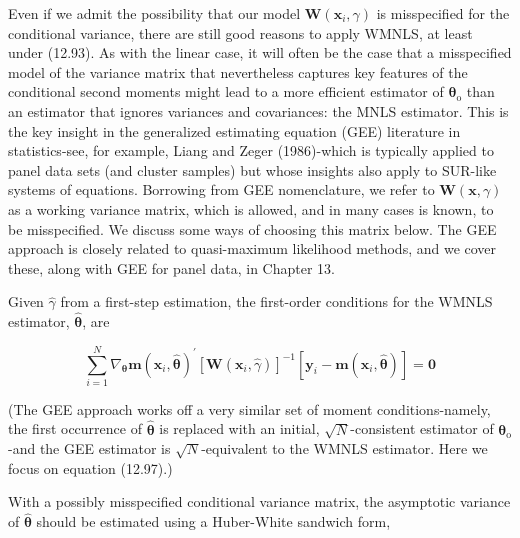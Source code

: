 \documentclass[10pt]{article}
\begin{document}
Even if we admit the possibility that our model $\mathbf{W}\left(\mathbf{x}_{i}, \gamma\right)$ is misspecified for the conditional variance, there are still good reasons to apply WMNLS, at least under (12.93). As with the linear case, it will often be the case that a misspecified model of the variance matrix that nevertheless captures key features of the conditional second moments might lead to a more efficient estimator of $\boldsymbol{\theta}_{\mathrm{o}}$ than an estimator that ignores variances and covariances: the MNLS estimator. This is the key insight in the generalized estimating equation (GEE) literature in statistics-see, for example, Liang and Zeger (1986)-which is typically applied to panel data sets (and cluster samples) but whose insights also apply to SUR-like systems of equations. Borrowing from GEE nomenclature, we refer to $\mathbf{W}(\mathbf{x}, \gamma)$ as a working variance matrix, which is allowed, and in many cases is known, to be misspecified. We discuss some ways of choosing this matrix below. The GEE approach is closely related to quasi-maximum likelihood methods, and we cover these, along with GEE for panel data, in Chapter 13.

Given $\hat{\gamma}$ from a first-step estimation, the first-order conditions for the WMNLS estimator, $\hat{\boldsymbol{\theta}}$, are


\begin{equation*}
\sum_{i=1}^{N} \nabla_{\boldsymbol{\theta}} \mathbf{m}\left(\mathbf{x}_{i}, \hat{\boldsymbol{\theta}}\right)^{\prime}\left[\mathbf{W}\left(\mathbf{x}_{i}, \hat{\gamma}\right)\right]^{-1}\left[\mathbf{y}_{i}-\mathbf{m}\left(\mathbf{x}_{i}, \hat{\boldsymbol{\theta}}\right)\right]=\mathbf{0} \tag{12.97}
\end{equation*}


(The GEE approach works off a very similar set of moment conditions-namely, the first occurrence of $\hat{\boldsymbol{\theta}}$ is replaced with an initial, $\sqrt{N}$-consistent estimator of $\boldsymbol{\theta}_{\mathrm{o}}$-and the GEE estimator is $\sqrt{N}$-equivalent to the WMNLS estimator. Here we focus on equation (12.97).)

With a possibly misspecified conditional variance matrix, the asymptotic variance of $\hat{\boldsymbol{\theta}}$ should be estimated using a Huber-White sandwich form,
\end{document}
